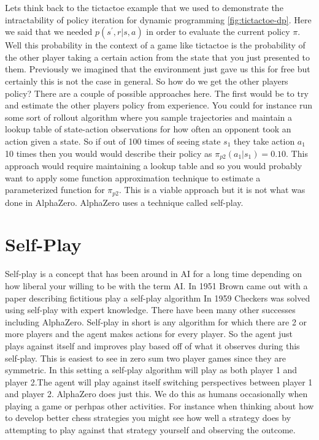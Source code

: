 Lets think back to the tictactoe example that we used to demonstrate the intractability of policy iteration for dynamic programming \ref{fig:tictactoe-dp}. Here we said that we needed $p(s^{'},r | s , a)$ in order to evaluate the current policy $\pi$. Well this probability in the context of a game like tictactoe is the probability of the other player taking a certain action from the state that you just presented to them. Previously we imagined that the environment just gave us this for free but certainly this is not the case in general. So how do we get the other players policy? There are a couple of possible approaches here. The first would be to try and estimate the other players policy from experience. You could for instance run some sort of rollout algorithm where you sample trajectories and maintain a lookup table of state-action observations for how often an opponent took an action given a state. So if out of 100 times of seeing state $s_{1}$ they take action $a_{1}$ 10 times then you would would describe their policy as $\pi_{p2}(a_{1}|s_{1}) = 0.10$. This approach would require maintaining a lookup table and so you would probably want to apply some function approximation technique to estimate a parameterized function for $\pi_{p2}$. This is a viable approach but it is not what was done in AlphaZero. AlphaZero uses a technique called self-play. 

\section{Self-Play}

Self-play is a concept that has been around in AI for a long time depending on how liberal your willing to be with the term AI. In 1951 Brown came out with a paper describing fictitious play a self-play algorithm In 1959 Checkers was solved using self-play with expert knowledge. There have been many other successes including AlphaZero. Self-play in short is any algorithm for which there are 2 or more players and the agent makes actions for every player. So the agent just plays against itself and improves play based off of what it observes during this self-play. This is easiest to see in zero sum two player games since they are symmetric. In this setting a self-play algorithm will play as both player 1 and player 2.The agent will play against itself switching perspectives between player 1 and player 2. AlphaZero does just this. We do this as humans occasionally when playing a game or perhpas other activities. For instance when thinking about how to develop better chess strategies you might see how well a strategy does by attempting to play against that strategy yourself and observing the outcome. 

